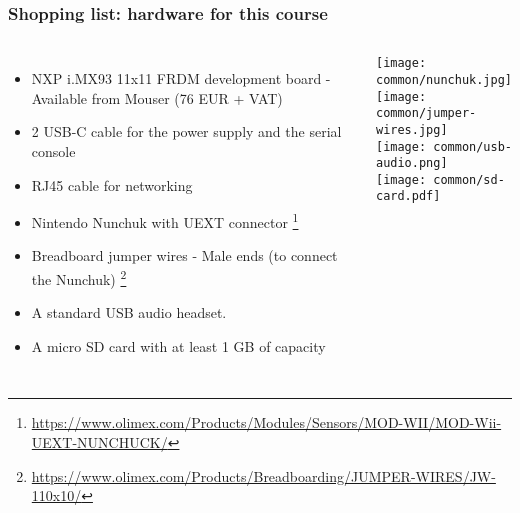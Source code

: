 \begin{frame}
\frametitle{Shopping list: hardware for this course}
  \begin{columns}
    \footnotesize
    \begin{itemize}
      \item NXP i.MX93 11x11 FRDM development board -
        Available from Mouser (76 EUR + VAT)
      \item 2 USB-C cable for the power supply and the serial console
      \item RJ45 cable for networking
      \item Nintendo Nunchuk with UEXT connector
            \footnote{\tiny \url{https://www.olimex.com/Products/Modules/Sensors/MOD-WII/MOD-Wii-UEXT-NUNCHUCK/}}
      \item Breadboard jumper wires - Male ends (to connect the Nunchuk)
            \footnote{\tiny \url{https://www.olimex.com/Products/Breadboarding/JUMPER-WIRES/JW-110x10/}}

      \item A standard USB audio headset.
      \item A micro SD card with at least 1 GB of capacity
    \end{itemize}
    \texttt{[image: common/nunchuk.jpg]} \\
    \texttt{[image: common/jumper-wires.jpg]} \\
    \texttt{[image: common/usb-audio.png]} \\
    \texttt{[image: common/sd-card.pdf]}
  \end{columns}
\end{frame}
